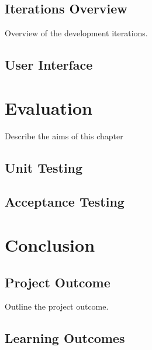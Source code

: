 \documentclass{4thYearProject}
\begin{document}
\section{Iterations Overview}

Overview of the development iterations.

\section{User Interface}

\chapter{Evaluation}

Describe the aims of this chapter

\section{Unit Testing}
\section{Acceptance Testing}


\chapter{Conclusion}

\section{Project Outcome}

Outline the project outcome. 

\section{Learning Outcomes}







\begin{appendices}
\end{appendices}
\end{document}
